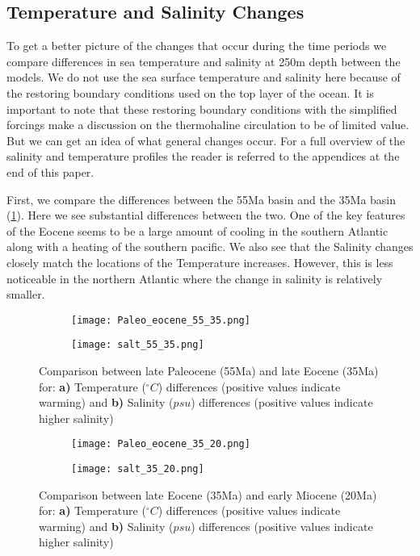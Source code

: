 \subsection{Temperature and Salinity Changes}\label{sec:temp+sal}
To get a better picture of the changes that occur during the time periods we compare differences in sea temperature and salinity at 250m depth between the models. We do not use the sea surface temperature and salinity here because of the restoring boundary conditions used on the top layer of the ocean. It is important to note that these restoring boundary conditions with the simplified forcings make a discussion on the thermohaline circulation to be of limited value. But we can get an idea of what general changes occur. For a full overview of the salinity and temperature profiles the reader is referred to the appendices at the end of this paper.

First, we compare the differences between the 55Ma basin and the 35Ma basin (\cref{fig:5535cooling}). Here we see substantial differences between the two. One of the key features of the Eocene seems to be a large amount of cooling in the southern Atlantic along with a heating of the southern pacific. We also see that the Salinity changes closely match the locations of the Temperature increases. However, this is less noticeable in the northern Atlantic where the change in salinity is relatively smaller.


\begin{figure}[H]
	\begin{subfigure}[b]{\linewidth}
		\caption{}
		\label{fig:5535cooling}
		\texttt{[image: Paleo\_eocene\_55\_35.png]}
		
		
	\end{subfigure}
	\begin{subfigure}[b]{\linewidth}
		\caption{}
		\label{fig:salt5535cooling}
		\texttt{[image: salt\_55\_35.png]}
		
		
	\end{subfigure}
	\caption{ Comparison between late Paleocene (55Ma) and late Eocene (35Ma) for: \textbf{a)} Temperature ($^{\circ}C$) differences (positive values indicate warming) and  \textbf{b)} Salinity ($psu$) differences (positive values indicate higher salinity)}
\end{figure}

\begin{figure}[H]
	\begin{subfigure}[b]{\linewidth}
		\caption{}
		\label{fig:3520cooling}
		\texttt{[image: Paleo\_eocene\_35\_20.png]}
		
	\end{subfigure}
	\begin{subfigure}[b]{\linewidth}
		\caption{}
		\label{fig:salt3520cooling}
		\texttt{[image: salt\_35\_20.png]}
		
	\end{subfigure}
	\caption{ Comparison between late Eocene (35Ma) and early Miocene (20Ma) for: \textbf{a)} Temperature ($^{\circ}C$) differences (positive values indicate warming) and  \textbf{b)} Salinity ($psu$) differences (positive values indicate higher salinity)}
\end{figure}

